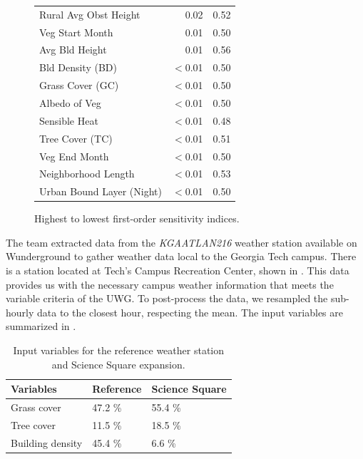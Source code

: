\documentclass[a4paper, 12pt]{article}
\begin{document}
\begin{figure}[htb]
\begin{minipage}[b]{0.48\textwidth}
\begin{tabular}{lrr}
        Rural Avg Obst Height & 0.02 & 0.52  \\
        Veg Start Month & 0.01 & 0.50 \\
        Avg Bld Height & 0.01  & 0.56   \\
        Bld Density (BD) &  $<$0.01      & 0.50   \\
        Grass Cover (GC) &   $<$0.01    &  0.50   \\
        Albedo of Veg &  $<$0.01    &  0.50  \\
        Sensible Heat &  $<$0.01    &  0.48  \\
        Tree Cover (TC) &    $<$0.01     &  0.51  \\
        Veg End Month &  $<$0.01     & 0.50  \\
        Neighborhood Length &  $<$0.01  & 0.53  \\
        Urban Bound Layer (Night) &  $<$0.01  &  0.50   \\
        \bottomrule
        \end{tabular}
        \caption{Highest to lowest first-order sensitivity indices.}
        \label{fig:sensitivity-indices}
    \end{minipage}
\end{figure}

The team extracted data from the \textit{KGAATLAN216} weather station available on Wunderground to gather weather data local to the Georgia Tech campus.
There is a station located at Tech's Campus Recreation Center, shown in .
This data provides us with the necessary campus weather information that meets the variable criteria of the UWG.
To post-process the data, we resampled the sub-hourly data to the closest hour, respecting the mean. 
The input variables are summarized in .


\begin{table}[!ht]
\footnotesize
    \centering
    \caption{Input variables for the reference weather station and Science Square expansion.}
    \begin{tabular}{lll}
    \toprule
        \textbf{Variables} & \textbf{Reference} & \textbf{Science Square} \\ \midrule
        Grass cover & 47.2 \% & 55.4 \% \\ 
        Tree cover & 11.5 \% & 18.5 \% \\ 
        Building density & 45.4 \% & 6.6 \% \\ \bottomrule
    \end{tabular}
    \label{tab:input_variables}
\end{table}
\end{document}
